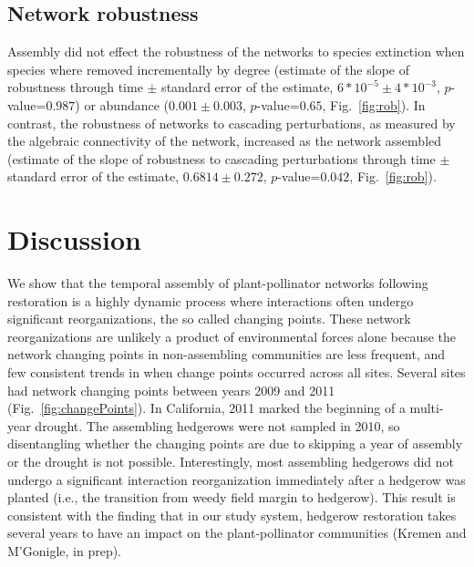 \documentclass[12pt]{article}
\begin{document}
\subsection*{Network robustness}
Assembly did not effect the robustness of the networks to species
extinction when species where removed incrementally by degree
(estimate of the slope of robustness through time $\pm$ standard error
of the estimate, $6*10^{-5} \pm 4*10^{-3}$, $p$-value=$0.987$) or
abundance ($0.001 \pm 0.003$, $p$-value=$0.65$,
Fig.~\ref{fig:rob}). In contrast, the robustness of networks to
cascading perturbations, as measured by the algebraic connectivity of
the network, increased as the network assembled (estimate of the slope
of robustness to cascading perturbations through time $\pm$ standard
error of the estimate, $0.6814 \pm 0.272$, $p$-value=$0.042$,
Fig.~\ref{fig:rob}).

\section*{Discussion}
\label{sec:discussion}

We show that the temporal assembly of plant-pollinator networks
following restoration is a highly dynamic process where interactions
often undergo significant reorganizations, the so called changing
points. These network reorganizations are unlikely a product of
environmental forces alone because the network changing points in
non-assembling communities are less frequent, and few consistent
trends in when change points occurred across all sites. Several sites
had network changing points between years 2009 and 2011
(Fig.~\ref{fig:changePoints}). In California, 2011 marked the
beginning of a multi-year drought. The assembling hedgerows were not
sampled in 2010, so disentangling whether the changing points are due
to skipping a year of assembly or the drought is not
possible. Interestingly, most assembling hedgerows did not undergo a
significant interaction reorganization immediately after a hedgerow
was planted (i.e., the transition from weedy field margin to
hedgerow). This result is consistent with the finding that in our
study system, hedgerow restoration takes several years to have an
impact on the plant-pollinator communities (Kremen and M'Gonigle, in
prep).
\end{document}
